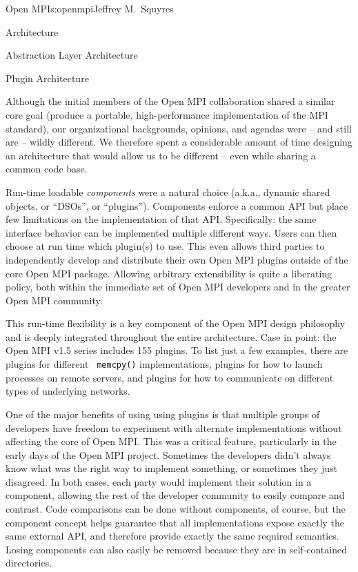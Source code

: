 \begin{aosachapter}{Open MPI}{s:openmpi}{Jeffrey M.\ Squyres}
\begin{aosasect1}{Architecture}
\begin{aosasect2}{Abstraction Layer Architecture}
\end{aosasect2}


\begin{aosasect2}{Plugin Architecture}


Although the initial members of the Open MPI collaboration shared a
similar core goal (produce a portable, high-performance
implementation of the MPI standard), our organizational backgrounds,
opinions, and agendas were -- and still are -- wildly different.
%
We therefore spent a considerable amount of time designing an
architecture that would allow us to be different -- even while sharing
a common code base.

Run-time loadable {\em components} were a natural choice (a.k.a.,
dynamic shared objects, or ``DSOs'', or ``plugins'').  Components
enforce a common API but place few limitations on the implementation
of that API.
%
Specifically: the same interface behavior can be implemented multiple
different ways.
%
Users can then choose at run time which plugin(s) to use.
%
This even allows third parties to independently develop and distribute
their own Open MPI plugins outside of the core Open MPI package.
%
Allowing arbitrary extensibility is quite a liberating policy, both
within the immediate set of Open MPI developers and in the greater
Open MPI community.

This run-time flexibility is a key component of the Open MPI design
philosophy and is deeply integrated throughout the entire
architecture.
%
Case in point: the Open MPI v1.5 series includes 155 plugins.
%
To list just a few examples, there are plugins for different {\tt
  memcpy()} implementations, plugins for how to launch processes on
remote servers, and plugins for how to communicate on different types
of underlying networks.

One of the major benefits of using using plugins is that multiple
groups of developers have freedom to experiment with alternate
implementations without affecting the core of Open MPI.
%
This was a critical feature, particularly in the early days of the
Open MPI project.  Sometimes the developers didn't always know what
was the right way to implement something, or sometimes they just
disagreed.
%
In both cases, each party would implement their solution in a
component, allowing the rest of the developer community to easily
compare and contrast. 
%
Code comparisons can be done without components, of course, but the
component concept helps guarantee that all implementations expose
exactly the same external API, and therefore provide exactly the same
required semantics.  Losing components can also easily be removed
because they are in self-contained directories.


\end{aosasect2}
\end{aosasect1}
\end{aosachapter}
